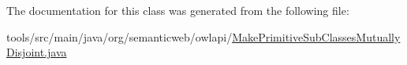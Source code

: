 The documentation for this class was generated from the following file\-:\begin{DoxyCompactItemize}
\item 
tools/src/main/java/org/semanticweb/owlapi/\hyperlink{_make_primitive_sub_classes_mutually_disjoint_8java}{Make\-Primitive\-Sub\-Classes\-Mutually\-Disjoint.\-java}\end{DoxyCompactItemize}
